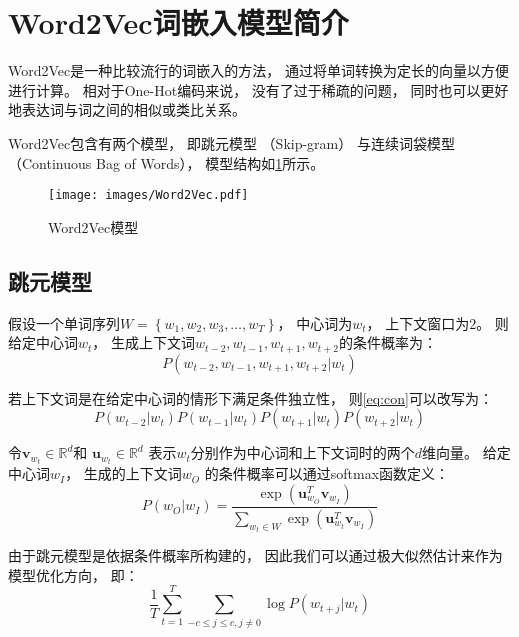 \section{Word2Vec词嵌入模型简介}

Word2Vec是一种比较流行的词嵌入的方法，
通过将单词转换为定长的向量以方便进行计算。
相对于One-Hot编码来说，
没有了过于稀疏的问题，
同时也可以更好地表达词与词之间的相似或类比关系。

Word2Vec包含有两个模型，
即跳元模型\cite{mikolovDistributedRepresentationsWords2013}
（Skip-gram）
与连续词袋模型\cite{mikolovEfficientEstimationWord2013}
（Continuous Bag of Words），
模型结构如\cref{fig:Word2Vec}所示。

\begin{figure}[!htbp]
    \centering
    \texttt{[image: images/Word2Vec.pdf]}
    \caption{Word2Vec模型}\label{fig:Word2Vec}
\end{figure}

\subsection{跳元模型}

假设一个单词序列$W = \left\{w_1, w_2, w_3, \ldots, w_T\right\}$，
中心词为$w_t$，
上下文窗口为$2$。
则给定中心词$w_t$，
生成上下文词$w_{t-2}, w_{t-1}, w_{t+1}, w_{t+2}$的条件概率为：
\begin{equation}
    \label{eq:con}
    P(w_{t-2}, w_{t-1}, w_{t+1}, w_{t+2}|w_t)
\end{equation}

若上下文词是在给定中心词的情形下满足条件独立性，
则\cref{eq:con}可以改写为：
\begin{equation}
    P(w_{t-2}|w_t)P(w_{t-1}|w_t)P(w_{t+1}|w_t)P(w_{t+2}|w_t)
\end{equation}

令$\mathbf{v}_{w_t}\in\mathbb{R}^d$和
$\mathbf{u}_{w_t}\in\mathbb{R}^d$
表示$w_t$分别作为中心词和上下文词时的两个$d$维向量。
给定中心词$w_I$，
生成的上下文词$w_O$
的条件概率可以通过softmax函数定义：
\begin{equation}
    P\left(w_O|w_I\right) = \frac{\exp\left(\mathbf{u}_{w_O}^T\mathbf{v}_{w_I}\right)}{\sum_{w_t\in W}\exp\left(\mathbf{u}_{w_t}^T\mathbf{v}_{w_I}\right)}
\end{equation}

由于跳元模型是依据条件概率所构建的，
因此我们可以通过极大似然估计来作为模型优化方向，
即：
\begin{equation}
    \frac{1}{T}\sum^T_{t=1}\sum_{-c\leqslant j\leqslant c, j\neq 0}\log P\left(w_{t+j}|w_t\right)
\end{equation}

